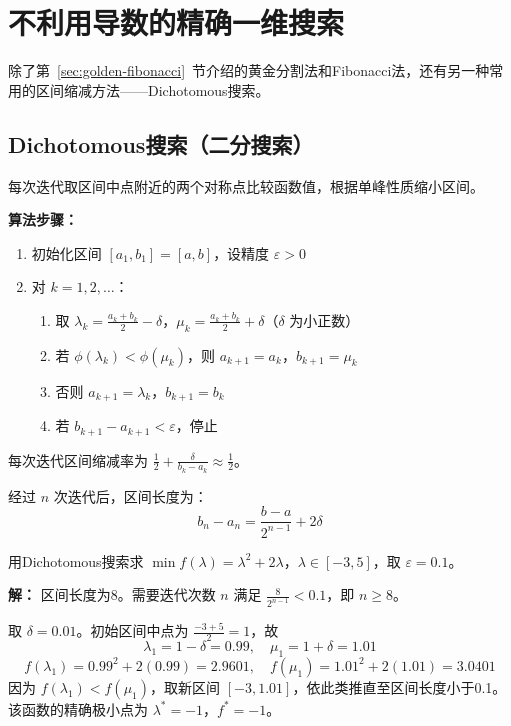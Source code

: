 \section{不利用导数的精确一维搜索}

除了第~\ref{sec:golden-fibonacci}~节介绍的黄金分割法和Fibonacci法，还有另一种常用的区间缩减方法——Dichotomous搜索。

\subsection{Dichotomous搜索（二分搜索）}\label{sec:dichotomous}

\begin{conceptbox}[基本思想]
每次迭代取区间中点附近的两个对称点比较函数值，根据单峰性质缩小区间。
\end{conceptbox}

\textbf{算法步骤：}
\begin{enumerate}
    \item 初始化区间 $[a_1, b_1] = [a, b]$，设精度 $\varepsilon > 0$
    \item 对 $k = 1, 2, \ldots$：
    \begin{enumerate}
        \item 取 $\lambda_k = \frac{a_k + b_k}{2} - \delta$，$\mu_k = \frac{a_k + b_k}{2} + \delta$（$\delta$ 为小正数）
        \item 若 $\phi(\lambda_k) < \phi(\mu_k)$，则 $a_{k+1} = a_k$，$b_{k+1} = \mu_k$
        \item 否则 $a_{k+1} = \lambda_k$，$b_{k+1} = b_k$
        \item 若 $b_{k+1} - a_{k+1} < \varepsilon$，停止
    \end{enumerate}
\end{enumerate}

\begin{notebox}[区间缩减率]
每次迭代区间缩减率为 $\frac{1}{2} + \frac{\delta}{b_k - a_k} \approx \frac{1}{2}$。

经过 $n$ 次迭代后，区间长度为：
\[
b_n - a_n = \frac{b - a}{2^{n-1}} + 2\delta
\]
\end{notebox}

\begin{example}[Dichotomous搜索]
用Dichotomous搜索求 $\min f(\lambda) = \lambda^2 + 2\lambda$，$\lambda \in [-3, 5]$，取 $\varepsilon = 0.1$。

\textbf{解：} 区间长度为8。需要迭代次数 $n$ 满足 $\frac{8}{2^{n-1}} < 0.1$，即 $n \geq 8$。

取 $\delta = 0.01$。初始区间中点为 $\frac{-3+5}{2}=1$，故
\[
\lambda_1 = 1-\delta = 0.99,\quad \mu_1 = 1+\delta = 1.01
\]
\[
f(\lambda_1) = 0.99^2 + 2(0.99) = 2.9601,\quad
f(\mu_1) = 1.01^2 + 2(1.01) = 3.0401
\]
因为 $f(\lambda_1) < f(\mu_1)$，取新区间 $[-3, 1.01]$，依此类推直至区间长度小于0.1。该函数的精确极小点为 $\lambda^*=-1$，$f^*=-1$。
\end{example}

